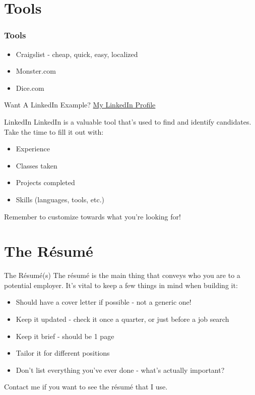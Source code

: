 \documentclass{beamer}
\begin{document}
\section{Tools}
\begin{frame}\frametitle{Tools}

\begin{itemize}
  \item Craigslist - cheap, quick, easy, localized
  \item Monster.com
  \item Dice.com
\end{itemize}
\vfill
  \begin{block}{Want A LinkedIn Example?}
  \href{http://www.linkedin.com/pub/chris-sims/16/655/883}{My LinkedIn Profile}
  \end{block}
\end{frame}

\begin{frame}{LinkedIn}
  LinkedIn is a valuable tool that's used to find and identify
  candidates. \\
  \vfill
  Take the time to fill it out with:
  \begin{itemize}
    \item Experience
    \item Classes taken
    \item Projects completed
    \item Skills (languages, tools, etc.)
  \end{itemize}
  \vfill
  Remember to customize towards what you're looking for!

\end{frame}

\section{The R\'esum\'e}

\begin{frame}{The R\'esum\'e(s)}
  The r\'esum\'e is the main thing that conveys who you are to a potential
  employer. It's vital to keep a few things in mind when building it:

  \begin{itemize}
    \item Should have a cover letter if possible - not a generic one!
    \item Keep it updated - check it once a quarter, or just before a job
          search
    \item Keep it brief - should be 1 page
    \item Tailor it for different positions
    \item Don't list everything you've ever done - what's actually important?
  \end{itemize}

  Contact me if you want to see the r\'esum\'e that I use.
\end{frame}
\end{document}
